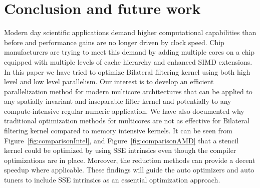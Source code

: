 \documentclass{IEEEtran}
\begin{document}
\section{Conclusion and future work}
\label{sec:conclusion} 
Modern day scientific applications demand higher computational capabilities than before and performance gains are no longer driven by clock speed. Chip manufacturers are trying to meet this demand by adding multiple cores on a chip equipped with multiple levels of cache hierarchy and enhanced SIMD extensions. In this paper we have tried to optimize Bilateral filtering kernel using both high level and low level parallelism. Our interest is to develop an efficient parallelization method for modern multicore architectures that can be applied to any spatially invariant and inseparable filter kernel and potentially to any compute-intensive regular numeric application. We have also documented why traditional optimization methods for multicores are not as effective for Bilateral filtering kernel compared to memory intensive kernels. It can be seen from Figure~\ref{fig:comparisonIntel}, and Figure~\ref{fig:comparisonAMD} that a stencil kernel could be optimized by using SSE intrinsics even though the compiler optimizations are in place. Moreover, the reduction methods can provide a decent speedup where applicable. These findings will guide the auto optimizers and auto tuners to include SSE intrinsics as an essential optimization approach.


  
\end{document}
